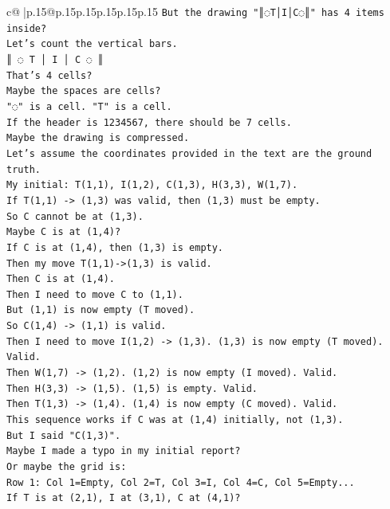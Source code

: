 \documentclass{article}
\begin{document}
{\begin{supertabular}{c@{$\;$}|p{.15\linewidth}@{}p{.15\linewidth}p{.15\linewidth}p{.15\linewidth}p{.15\linewidth}p{.15\linewidth}}
{{{\texttt{But the drawing "║◌T│I│C◌║" has 4 items inside?} \\
\texttt{Let's count the vertical bars.} \\
\texttt{║ ◌ T │ I │ C ◌ ║} \\
\texttt{That's 4 cells?} \\
\texttt{Maybe the spaces are cells?} \\
\texttt{"◌" is a cell. "T" is a cell.} \\
\texttt{If the header is 1234567, there should be 7 cells.} \\
\texttt{Maybe the drawing is compressed.} \\
\texttt{Let's assume the coordinates provided in the text are the ground truth.} \\
\texttt{My initial: T(1,1), I(1,2), C(1,3), H(3,3), W(1,7).} \\
\texttt{If T(1,1) {-}> (1,3) was valid, then (1,3) must be empty.} \\
\texttt{So C cannot be at (1,3).} \\
\texttt{Maybe C is at (1,4)?} \\
\texttt{If C is at (1,4), then (1,3) is empty.} \\
\texttt{Then my move T(1,1){-}>(1,3) is valid.} \\
\texttt{Then C is at (1,4).} \\
\texttt{Then I need to move C to (1,1).} \\
\texttt{But (1,1) is now empty (T moved).} \\
\texttt{So C(1,4) {-}> (1,1) is valid.} \\
\texttt{Then I need to move I(1,2) {-}> (1,3). (1,3) is now empty (T moved). Valid.} \\
\texttt{Then W(1,7) {-}> (1,2). (1,2) is now empty (I moved). Valid.} \\
\texttt{Then H(3,3) {-}> (1,5). (1,5) is empty. Valid.} \\
\texttt{Then T(1,3) {-}> (1,4). (1,4) is now empty (C moved). Valid.} \\
\texttt{This sequence works if C was at (1,4) initially, not (1,3).} \\
\texttt{But I said "C(1,3)".} \\
\texttt{Maybe I made a typo in my initial report?} \\
\texttt{Or maybe the grid is:} \\
\texttt{Row 1: Col 1=Empty, Col 2=T, Col 3=I, Col 4=C, Col 5=Empty...} \\
\texttt{If T is at (2,1), I at (3,1), C at (4,1)?} \\
}}}
\end{supertabular}}
\end{document}
